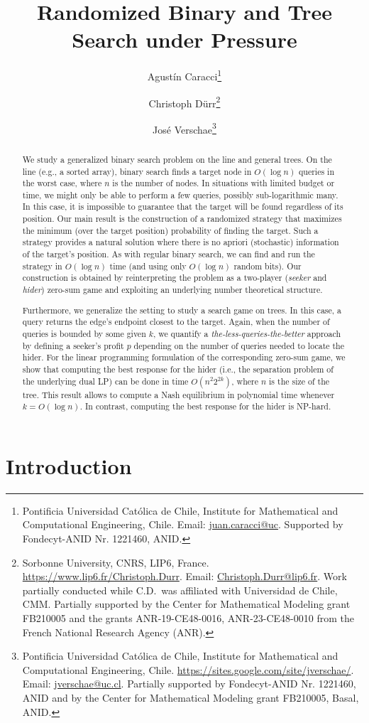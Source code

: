 \documentclass[11pt]{article}
\title{Randomized Binary and Tree Search under Pressure}
\author{Agustín Caracci\thanks{Pontificia Universidad Católica de Chile, Institute for Mathematical and Computational Engineering, Chile. Email: \href{mailto:juan.caracci@uc.cl}{juan.caracci@uc}. Supported by Fondecyt-ANID Nr. 1221460, ANID.} \and
Christoph Dürr\thanks{Sorbonne University, CNRS, LIP6, France. \url{https://www.lip6.fr/Christoph.Durr}. Email: \href{mailto:Christoph.Durr@lip6.fr}{Christoph.Durr@lip6.fr}. Work partially conducted while C.D.\ was affiliated with Universidad de Chile, CMM. Partially supported by the Center for Mathematical Modeling grant FB210005 and the grants ANR-19-CE48-0016, ANR-23-CE48-0010 from the French National Research Agency (ANR).} \and
José Verschae\thanks{Pontificia Universidad Católica de Chile, Institute for Mathematical and Computational Engineering, Chile.  \url{https://sites.google.com/site/jverschae/}. Email: \href{mailto:jverschae@uc.cl}{jverschae@uc.cl}. Partially supported by Fondecyt-ANID Nr. 1221460,
ANID and  by the Center for Mathematical Modeling grant FB210005, Basal, ANID.}}
\newcommand\+{\mkern2mu}
\begin{document}
\maketitle

\begin{abstract}We study a generalized binary search problem on the line and general trees. On the line (e.g., a sorted array), binary search finds a target node in $O(\log n)$ queries in the worst case, where $n$ is the number of nodes. In situations with limited budget or time, we might only be able to perform a few queries, possibly sub-logarithmic many. In this case, it is impossible to guarantee that the target will be found regardless of its position. Our main result is the construction of a randomized strategy that maximizes the minimum (over the target position) probability of finding the target. Such a strategy provides a natural solution where there is no apriori (stochastic) information of the target's position. As with regular binary search, we can find and run the strategy in $O(\log n)$ time (and using only $O(\log n)$ random bits). Our construction is obtained by reinterpreting the problem as a two-player (\textit{seeker} and \textit{hider}) zero-sum game and exploiting an underlying number theoretical structure.

Furthermore, we generalize the setting to study a search game on trees. In this case, a query returns the edge's endpoint closest to the target. Again, when the number of queries is bounded by some given $k$, we quantify a \emph{the-less-queries-the-better} approach by defining a seeker's profit $p$ depending on the number of queries needed to locate the hider. For the linear programming formulation of the corresponding zero-sum game, we show that computing the best response for the hider (i.e., the separation problem of the underlying dual LP) can be done in time $O(n^2 2^{2k})$, where $n$ is the size of the tree. This result allows to compute a Nash equilibrium in polynomial time whenever $k=O(\log n)$. In contrast, computing the best response for the hider is NP-hard.

\end{abstract}

\section{Introduction}
\label{sec:Introduction}
\end{document}
